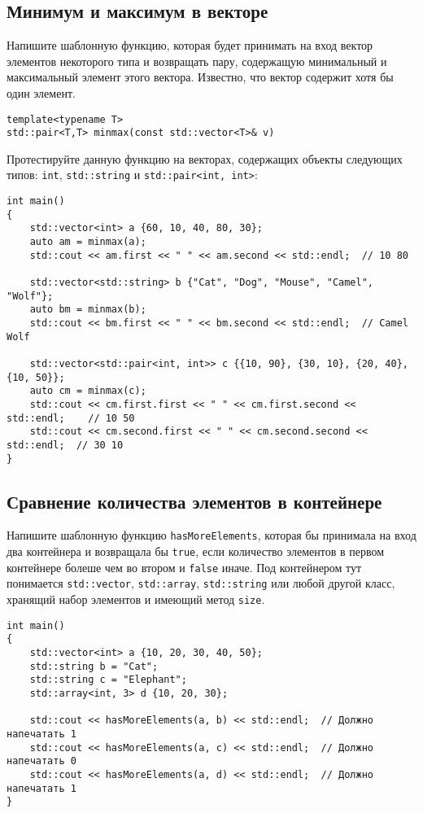 \documentclass{article}
\begin{document}
\subsection{Минимум и максимум в векторе}
Напишите шаблонную функцию, которая будет принимать на вход вектор элементов некоторого типа и возвращать пару, содержащую минимальный и максимальный элемент этого вектора. Известно, что вектор содержит хотя бы один элемент.
\begin{lstlisting}
template<typename T>
std::pair<T,T> minmax(const std::vector<T>& v)
\end{lstlisting}
Протестируйте данную функцию на векторах, содержащих объекты следующих типов: \texttt{int}, \texttt{std::string} и \texttt{std::pair<int, int>}:
\begin{lstlisting}
int main()
{
	std::vector<int> a {60, 10, 40, 80, 30};
	auto am = minmax(a);
	std::cout << am.first << " " << am.second << std::endl;  // 10 80
	
	std::vector<std::string> b {"Cat", "Dog", "Mouse", "Camel", "Wolf"};
	auto bm = minmax(b);
	std::cout << bm.first << " " << bm.second << std::endl;  // Camel Wolf

	std::vector<std::pair<int, int>> c {{10, 90}, {30, 10}, {20, 40}, {10, 50}};
	auto cm = minmax(c);
	std::cout << cm.first.first << " " << cm.first.second << std::endl;    // 10 50
	std::cout << cm.second.first << " " << cm.second.second << std::endl;  // 30 10
}
\end{lstlisting}



\subsection{Сравнение количества элементов в контейнере}
Напишите шаблонную функцию \texttt{hasMoreElements}, которая бы принимала на вход два контейнера и возвращала бы \texttt{true}, если количество элементов в первом контейнере болеше чем во втором и \texttt{false} иначе. Под контейнером тут понимается \texttt{std::vector}, \texttt{std::array}, \texttt{std::string} или любой другой класс, хранящий набор элементов и имеющий метод \texttt{size}.
\begin{lstlisting}
int main()
{
	std::vector<int> a {10, 20, 30, 40, 50};
	std::string b = "Cat";
	std::string c = "Elephant";
	std::array<int, 3> d {10, 20, 30};
	
	std::cout << hasMoreElements(a, b) << std::endl;  // Должно напечатать 1
	std::cout << hasMoreElements(a, c) << std::endl;  // Должно напечатать 0
	std::cout << hasMoreElements(a, d) << std::endl;  // Должно напечатать 1
}
\end{lstlisting}
\end{document}
